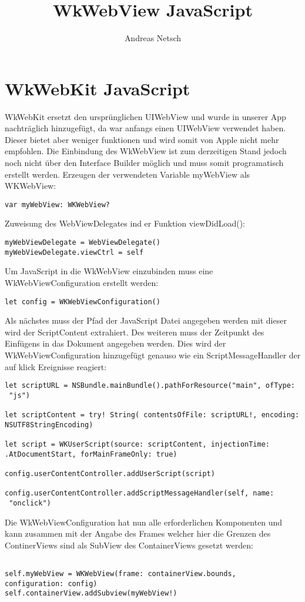 
\title{WkWebView JavaScript}
\author{Andreas Netsch}



\section{ WkWebKit JavaScript}

WkWebKit ersetzt den ursprünglichen UIWebView und wurde in unserer App nachträglich hinzugefügt, da war anfangs einen UIWebView verwendet haben. Dieser bietet aber weniger funktionen und wird somit von Apple nicht mehr empfohlen. Die Einbindung des WkWebView ist zum derzeitigen Stand jedoch noch nicht über den Interface Builder möglich und muss somit programatisch erstellt werden.
Erzeugen der verwendeten Variable myWebView als WKWebView:
\begin{verbatim}
var myWebView: WKWebView?
\end{verbatim}
Zuweisung des WebViewDelegates ind er Funktion viewDidLoad():
\begin{verbatim}
myWebViewDelegate = WebViewDelegate()
myWebViewDelegate.viewCtrl = self
\end{verbatim}
Um JavaScript in die WkWebView einzubinden muss eine WkWebViewConfiguration erstellt werden:
\begin{verbatim}
let config = WKWebViewConfiguration()
\end{verbatim}
Als nächstes muss der Pfad der JavaScript Datei angegeben werden mit dieser wird der ScriptContent extrahiert. Des weiteren muss der Zeitpunkt des Einfügens in das Dokument angegeben werden. Dies wird der WkWebViewConfiguration hinzugefügt genauso wie ein ScriptMessageHandler der auf klick Ereignisse reagiert:
\begin{verbatim}
let scriptURL = NSBundle.mainBundle().pathForResource("main", ofType:
 "js")
 
let scriptContent = try! String( contentsOfFile: scriptURL!, encoding:
NSUTF8StringEncoding)

let script = WKUserScript(source: scriptContent, injectionTime: 
.AtDocumentStart, forMainFrameOnly: true)

config.userContentController.addUserScript(script)
        
config.userContentController.addScriptMessageHandler(self, name:
 "onclick")
\end{verbatim}
Die WkWebViewConfiguration hat nun alle erforderlichen Komponenten und kann zusammen mit der Angabe des Frames welcher hier die Grenzen des ContinerViews sind als SubView des ContainerViews gesetzt werden:
\begin{verbatim}

self.myWebView = WKWebView(frame: containerView.bounds,
configuration: config)
self.containerView.addSubview(myWebView!)
\end{verbatim}


\pagebreak

